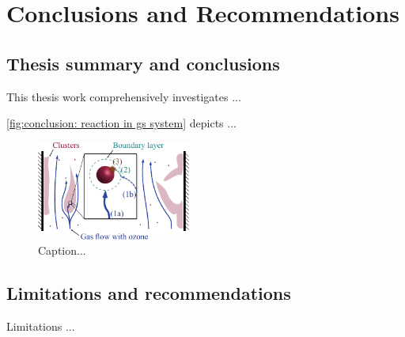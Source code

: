 \chapter{Conclusions and Recommendations}
\label{chap: conclustion}
\begin{refsection}

\section{Thesis summary and conclusions}

This thesis work comprehensively investigates ...

\autoref{fig:conclusion: reaction in gs system} depicts ...
\begin{figure}[htp]
    \vspace{10pt}
    \centering
    \includegraphics[width=0.45\textwidth]{fig/reaction_in_gs_system.pdf}
    \caption{Caption...}
    \label{fig:conclusion: reaction in gs system}
\end{figure}


\section{Limitations and recommendations}

Limitations ...


\pagebreak
{}
\begin{singlespacing}
\printbibliography[heading=subbibliography]
\end{singlespacing}

\end{refsection}